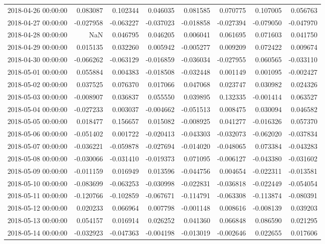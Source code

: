 \begin{tabular}{lrrrrrrr}
2018-04-26 00:00:00 & 0.083087 & 0.102344 & 0.046035 & 0.081585 & 0.070775 & 0.107005 & 0.056763 \\
2018-04-27 00:00:00 & -0.027958 & -0.063227 & -0.037023 & -0.018858 & -0.027394 & -0.079050 & -0.047970 \\
2018-04-28 00:00:00 & NaN & 0.046795 & 0.046205 & 0.006041 & 0.061695 & 0.071603 & 0.041750 \\
2018-04-29 00:00:00 & 0.015135 & 0.032260 & 0.005942 & -0.005277 & 0.009209 & 0.072422 & 0.009674 \\
2018-04-30 00:00:00 & -0.066262 & -0.063129 & -0.016859 & -0.036034 & -0.027955 & 0.060565 & -0.033110 \\
2018-05-01 00:00:00 & 0.055884 & 0.004383 & -0.018508 & -0.032448 & 0.001149 & 0.001095 & -0.002427 \\
2018-05-02 00:00:00 & 0.037525 & 0.076370 & 0.017066 & 0.047068 & 0.023747 & 0.030982 & 0.024326 \\
2018-05-03 00:00:00 & -0.008907 & 0.036837 & 0.055550 & 0.039895 & 0.132335 & -0.001414 & 0.063527 \\
2018-05-04 00:00:00 & -0.027233 & 0.003037 & -0.004662 & -0.051513 & 0.008475 & 0.030094 & 0.046582 \\
2018-05-05 00:00:00 & 0.018477 & 0.156657 & 0.015082 & -0.008925 & 0.041277 & -0.016326 & 0.057370 \\
2018-05-06 00:00:00 & -0.051402 & 0.001722 & -0.020413 & -0.043303 & -0.032073 & -0.062020 & -0.037834 \\
2018-05-07 00:00:00 & -0.036221 & -0.059878 & -0.027694 & -0.014020 & -0.048065 & 0.073384 & -0.043283 \\
2018-05-08 00:00:00 & -0.030066 & -0.031410 & -0.019373 & 0.071095 & -0.006127 & -0.043380 & -0.031602 \\
2018-05-09 00:00:00 & -0.011159 & 0.016949 & 0.013596 & -0.044756 & 0.004654 & -0.022311 & -0.013581 \\
2018-05-10 00:00:00 & -0.083699 & -0.063253 & -0.030998 & -0.022831 & -0.036818 & -0.022449 & -0.054054 \\
2018-05-11 00:00:00 & -0.120766 & -0.102859 & -0.067671 & -0.114791 & -0.063308 & -0.113874 & -0.080391 \\
2018-05-12 00:00:00 & 0.020233 & 0.066964 & 0.007798 & -0.001148 & 0.008616 & -0.008139 & 0.039203 \\
2018-05-13 00:00:00 & 0.054157 & 0.016914 & 0.026252 & 0.041360 & 0.066848 & 0.086590 & 0.021295 \\
2018-05-14 00:00:00 & -0.032923 & -0.047363 & -0.004198 & -0.013019 & -0.002646 & 0.022655 & 0.017606 \\

\end{tabular}
